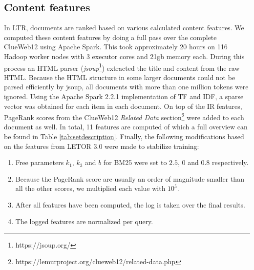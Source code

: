 \subsection{Content features} \label{sec:contentfeature}
In LTR, documents are ranked based on various calculated content features. We computed these content features by doing a full pass over the complete ClueWeb12 using Apache Spark. This took approximately 20 hours on 116 Hadoop worker nodes with 3 executor cores and 21gb memory each. During this process an HTML parser (\textit{jsoup}\footnote{https://jsoup.org/}) extracted the title and content from the raw HTML. Because the HTML structure in some larger documents could not be parsed efficiently by jsoup, all documents with more than one million tokens were ignored. Using the Apache Spark 2.2.1 implementation of TF and IDF, a sparse vector was obtained for each item in each document.  On top of the IR features, PageRank scores from the ClueWeb12 \textit{Related Data} section\footnote{https://lemurproject.org/clueweb12/related-data.php} were added to each document as well. In total, 11 features are computed of which a full overview can be found in Table \ref{tab:setdescription}. Finally, the following modifications based on the features from LETOR 3.0 \cite{qin2010letor} were made to stabilize training:
\begin{enumerate}  
\item Free parameters $k_1$, $k_3$ and $b$ for BM25 were set to $2.5$, $0$ and $0.8$ respectively. 
\item Because the PageRank score are usually an order of magnitude smaller than all the other scores, we multiplied each value with $10^5$.
\item After all features have been computed, the log is taken over the final results.
\item The logged features are normalized per query.  
\end{enumerate}


